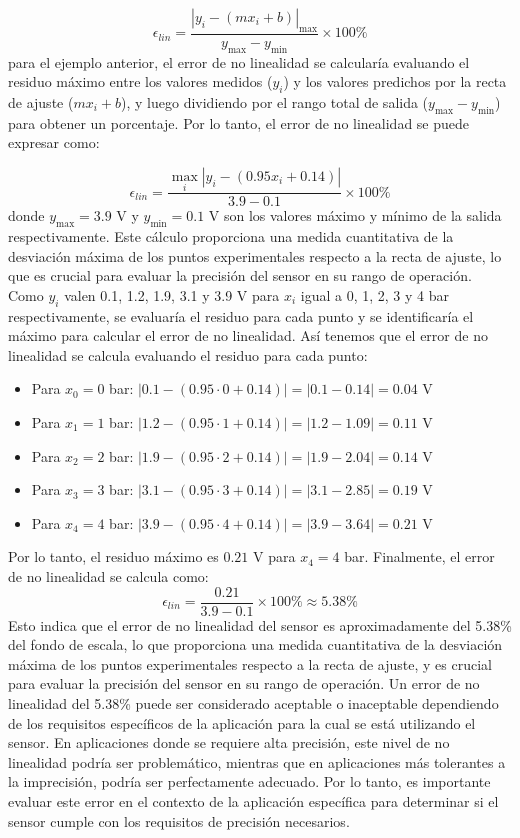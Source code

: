 \begin{equation}\label{eq:error_no_linealidad}
    \epsilon_{lin} = \frac{|y_i - (mx_i + b)|_{\max}}{y_{\max} - y_{\min}} \times 100\%
\end{equation}
para el ejemplo anterior, el error de no linealidad se calcularía evaluando el residuo máximo entre los valores medidos ($y_i$) y los valores predichos por la recta de ajuste ($mx_i + b$), y luego dividiendo por el rango total de salida ($y_{\max} - y_{\min}$) para obtener un porcentaje. Por lo tanto, el error de no linealidad se puede expresar como:

\begin{equation}
    \epsilon_{lin} = \frac{\max_i |y_i - (0.95x_i + 0.14)|}{3.9 - 0.1} \times 100\%
\end{equation}
donde $y_{\max} = 3.9$ V y $y_{\min} = 0.1$ V son los valores máximo y mínimo de la salida respectivamente. Este cálculo proporciona una medida cuantitativa de la desviación máxima de los puntos experimentales respecto a la recta de ajuste, lo que es crucial para evaluar la precisión del sensor en su rango de operación. Como $y_i$ valen 0.1, 1.2, 1.9, 3.1 y 3.9 V para $x_i$ igual a 0, 1, 2, 3 y 4 bar respectivamente, se evaluaría el residuo para cada punto y se identificaría el máximo para calcular el error de no linealidad. Así tenemos que el error de no linealidad se calcula evaluando el residuo para cada punto:
\begin{itemize}
    \item Para $x_0 = 0$ bar: $|0.1 - (0.95\cdot 0 + 0.14)| = |0.1 - 0.14| = 0.04$ V
    \item Para $x_1 = 1$ bar: $|1.2 - (0.95\cdot 1 + 0.14)| = |1.2 - 1.09| = 0.11$ V
    \item Para $x_2 = 2$ bar: $|1.9 - (0.95\cdot 2 + 0.14)| = |1.9 - 2.04| = 0.14$ V
    \item Para $x_3 = 3$ bar: $|3.1 - (0.95\cdot 3 + 0.14)| = |3.1 - 2.85| = 0.19$ V    
    \item Para $x_4 = 4$ bar: $|3.9 - (0.95\cdot 4 + 0.14)| = |3.9 - 3.64| = 0.21$ V
\end{itemize}
Por lo tanto, el residuo máximo es $0.21$ V para $x_4 = 4$ bar. Finalmente, el error de no linealidad se calcula como:
\begin{equation}
    \epsilon_{lin} = \frac{0.21}{3.9 - 0.1} \times 100\% \approx 5.38\%
\end{equation}
Esto indica que el error de no linealidad del sensor es aproximadamente del 5.38\% del fondo de escala, lo que proporciona una medida cuantitativa de la desviación máxima de los puntos experimentales respecto a la recta de ajuste, y es crucial para evaluar la precisión del sensor en su rango de operación. Un error de no linealidad del 5.38\% puede ser considerado aceptable o inaceptable dependiendo de los requisitos específicos de la aplicación para la cual se está utilizando el sensor. En aplicaciones donde se requiere alta precisión, este nivel de no linealidad podría ser problemático, mientras que en aplicaciones más tolerantes a la imprecisión, podría ser perfectamente adecuado. Por lo tanto, es importante evaluar este error en el contexto de la aplicación específica para determinar si el sensor cumple con los requisitos de precisión necesarios.
